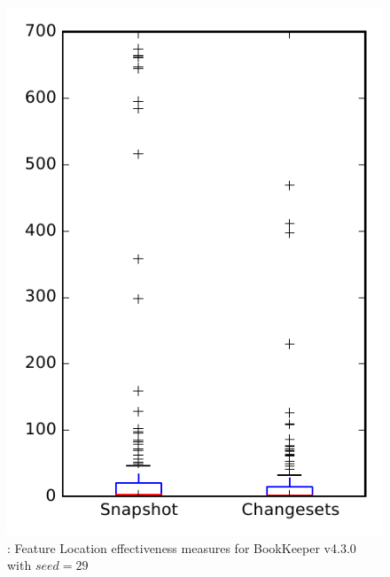 
\begin{figure}
\centering
\includegraphics[height=0.4\textheight]{figures/flt_seed/rq1_bookkeeper_29}
\caption{\rone: Feature Location effectiveness measures for BookKeeper v4.3.0 with $seed=29$}
\label{fig:flt_seed:rq1:bookkeeper}
\end{figure}
